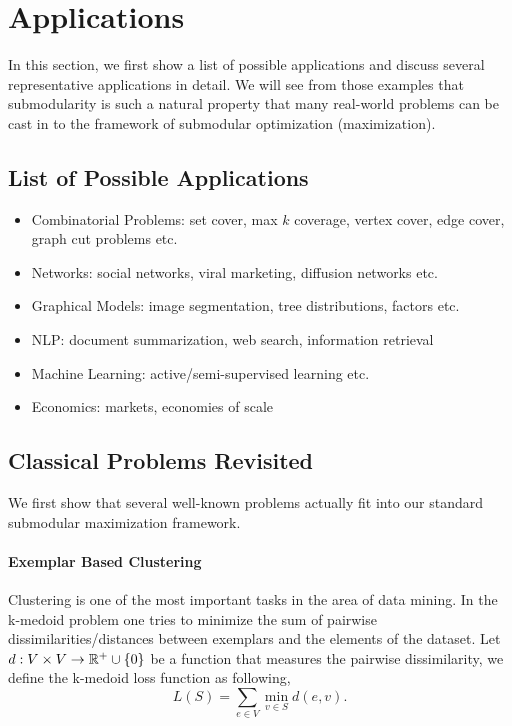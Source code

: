 \section{Applications}
In this section, we first show a list of possible applications and discuss several representative applications in detail. We will see from those examples that submodularity is such a natural property  that many real-world problems can be cast in to the framework of submodular optimization (maximization).


\subsection{List of Possible Applications}
\begin{itemize}
\item Combinatorial Problems: set cover, max $k$ coverage, vertex cover, edge cover, graph cut problems etc.
\item Networks: social networks, viral marketing, diffusion networks etc.
\item Graphical Models: image segmentation, tree distributions, factors etc.
\item NLP: document summarization, web search, information retrieval
\item Machine Learning: active/semi-supervised learning etc.
\item Economics: markets, economies of scale
\end{itemize}



\subsection{Classical Problems Revisited}
We first show that several well-known problems actually fit into our standard submodular maximization framework.

\paragraph{Exemplar Based Clustering}
Clustering is one of the most important tasks in the area of data mining. In the k-medoid problem \cite{KR09} one tries to minimize the sum of pairwise dissimilarities/distances between exemplars and the elements of the dataset. Let $d: V \times V \rightarrow \mathbb{R}^+\cup\{0\}$ be a function that measures the pairwise dissimilarity, we define the k-medoid loss function as following,
$$L(S) = \sum_{e\in V} \min_{v\in S} d(e, v).$$

